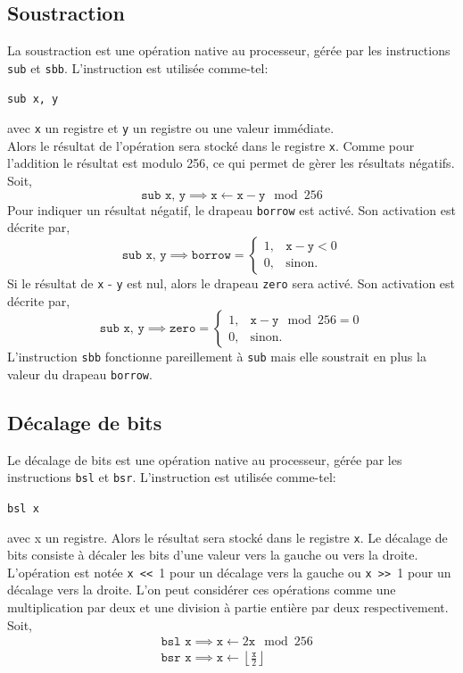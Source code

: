 \documentclass{article}
\begin{document}
\subsection{Soustraction}
La soustraction est une opération native au processeur, gérée par les instructions \texttt{sub} et \texttt{sbb}. L'instruction est utilisée comme-tel:
\begin{center}
\texttt{sub x, y}
\end{center}
avec \texttt{x} un registre et \texttt{y} un registre ou une valeur immédiate.\\
Alors le résultat de l'opération sera stocké dans le registre \texttt{x}. Comme pour l'addition le résultat est modulo 256, ce qui permet de gèrer les résultats négatifs. Soit,
$$\texttt{sub x, y} \implies \texttt{x} \leftarrow \texttt{x} - \texttt{y} \mod 256$$
Pour indiquer un résultat négatif, le drapeau \texttt{borrow} est activé. Son activation est décrite par,
$$\texttt{sub x, y} \implies \texttt{borrow} = \begin{cases}
1, & \texttt{x} - \texttt{y} < 0\\
0, & \text{sinon.}
\end{cases}$$
Si le résultat de \texttt{x} - \texttt{y} est nul, alors le drapeau \texttt{zero} sera activé. Son activation est décrite par,
$$\texttt{sub x, y} \implies \texttt{zero} = \begin{cases}
1, & \texttt{x} - \texttt{y}\mod 256= 0\\
0, & \text{sinon.}
\end{cases}$$
L'instruction \texttt{sbb} fonctionne pareillement à \texttt{sub} mais elle soustrait en plus la valeur du drapeau \texttt{borrow}.
\subsection{Décalage de bits}
Le décalage de bits est une opération native au processeur, gérée par les instructions \texttt{bsl} et \texttt{bsr}. L'instruction est utilisée comme-tel:
\begin{center}
\texttt{bsl x}
\end{center}
avec x un registre.
Alors le résultat sera stocké dans le registre \texttt{x}. Le décalage de bits consiste à décaler les bits d'une valeur vers la gauche ou vers la droite.
L'opération est notée \texttt{x}\verb| << |1 pour un décalage vers la gauche ou \texttt{x}\verb| >> |1 pour un décalage vers la droite.
L'on peut considérer ces opérations comme une multiplication par deux et une division à partie entière par deux respectivement. Soit, 
\begin{align*}
&\texttt{bsl x} \implies \texttt{x} \leftarrow2\texttt{x}\mod 256\\
&\texttt{bsr x} \implies \texttt{x} \leftarrow \left\lfloor\frac{\texttt{x}}{2}\right\rfloor
\end{align*}
\end{document}
